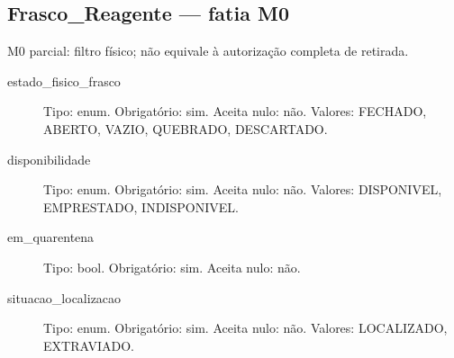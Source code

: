 \subsection*{Frasco\_Reagente --- fatia M0}
M0 parcial: filtro físico; não equivale à autorização completa de retirada.
\begin{description}
\item[estado\_fisico\_frasco] Tipo: enum. Obrigatório: sim. Aceita nulo: não.
Valores: FECHADO, ABERTO, VAZIO, QUEBRADO, DESCARTADO.
\item[disponibilidade] Tipo: enum. Obrigatório: sim. Aceita nulo: não.
Valores: DISPONIVEL, EMPRESTADO, INDISPONIVEL.
\item[em\_quarentena] Tipo: bool. Obrigatório: sim. Aceita nulo: não.
\item[situacao\_localizacao] Tipo: enum. Obrigatório: sim. Aceita nulo: não.
Valores: LOCALIZADO, EXTRAVIADO.
\end{description}
